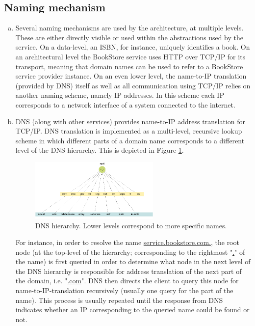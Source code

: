 \documentclass[11pt,a4paper,english]{article}
\begin{document}
\subsection{Naming mechanism}
\begin{enumerate}[(a)]
\item{Several naming mechanisms are used by the architecture, at multiple
    levels. These are either directly visible or used within the abstractions
    used by the service. On a data-level, an ISBN, for instance, uniquely
    identifies a book. On an architectural level the BookStore service uses HTTP
    over TCP/IP for its transport, meaning that domain names can be used to
    refer to a BookStore service provider instance. On an even lower level, the
    name-to-IP translation (provided by DNS) itself as well as all communication
    using TCP/IP relies on another naming scheme, namely IP addresses. In this scheme each IP corresponds to a network interface of a system connected to the internet.}

\item{DNS (along with other services) provides name-to-IP address translation for
    TCP/IP. DNS translation is implemented as a multi-level, recursive lookup scheme in which different parts of a domain name corresponds to a different level of the DNS hierarchy. This is depicted in Figure \ref{fig:dns}.
    
\begin{figure}[!hbt]
    \centering
    \includegraphics[width=0.6\textwidth]{img/dns.png}
    \caption{DNS hierarchy. Lower levels correspond to more specific names.}
    \label{fig:dns}
\end{figure}

For instance, in order to resolve the name \url{service.bookstore.com.}, the root node (at the top-level of the hierarchy; corresponding to the rightmost "\url{.}" of the name) is first queried in order to determine what node in the next level of the DNS hierarchy is responsible for address translation of the next part of the domain, i.e. "\url{.com}". DNS then directs the client to query this node for name-to-IP-translation recursively (usually one query for the part of the name). This process is usually repeated until the response from DNS indicates whether an IP corresponding to the queried name could be found or not.}
\end{enumerate}
\end{document}
